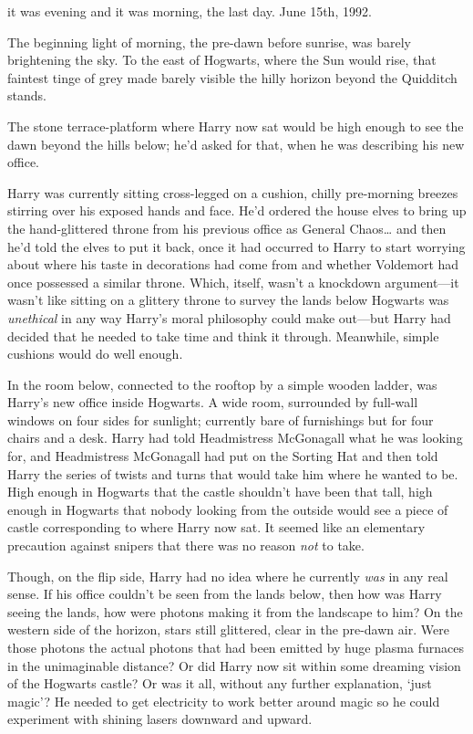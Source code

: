 
 it was evening and it was morning, the last day. June 15th, 1992.

\hplettrineextrapara
The beginning light of morning, the pre-dawn before sunrise, was barely brightening the sky. To the east of Hogwarts, where the Sun would rise, that faintest tinge of grey made barely visible the hilly horizon beyond the Quidditch stands.

The stone terrace-platform where Harry now sat would be high enough to see the dawn beyond the hills below; he'd asked for that, when he was describing his new office.

Harry was currently sitting cross-legged on a cushion, chilly pre-morning breezes stirring over his exposed hands and face. He'd ordered the house elves to bring up the hand-glittered throne from his previous office as General Chaos{\ldots} and then he'd told the elves to put it back, once it had occurred to Harry to start worrying about where his taste in decorations had come from and whether Voldemort had once possessed a similar throne. Which, itself, wasn't a knockdown argument---it wasn't like sitting on a glittery throne to survey the lands below Hogwarts was \emph{unethical} in any way Harry's moral philosophy could make out---but Harry had decided that he needed to take time and think it through. Meanwhile, simple cushions would do well enough.

In the room below, connected to the rooftop by a simple wooden ladder, was Harry's new office inside Hogwarts. A wide room, surrounded by full-wall windows on four sides for sunlight; currently bare of furnishings but for four chairs and a desk. Harry had told Headmistress McGonagall what he was looking for, and Headmistress McGonagall had put on the Sorting Hat and then told Harry the series of twists and turns that would take him where he wanted to be. High enough in Hogwarts that the castle shouldn't have been that tall, high enough in Hogwarts that nobody looking from the outside would see a piece of castle corresponding to where Harry now sat. It seemed like an elementary precaution against snipers that there was no reason \emph{not} to take.

Though, on the flip side, Harry had no idea where he currently \emph{was} in any real sense. If his office couldn't be seen from the lands below, then how was Harry seeing the lands, how were photons making it from the landscape to him? On the western side of the horizon, stars still glittered, clear in the pre-dawn air. Were those photons the actual photons that had been emitted by huge plasma furnaces in the unimaginable distance? Or did Harry now sit within some dreaming vision of the Hogwarts castle? Or was it all, without any further explanation, `just magic'? He needed to get electricity to work better around magic so he could experiment with shining lasers downward and upward.

